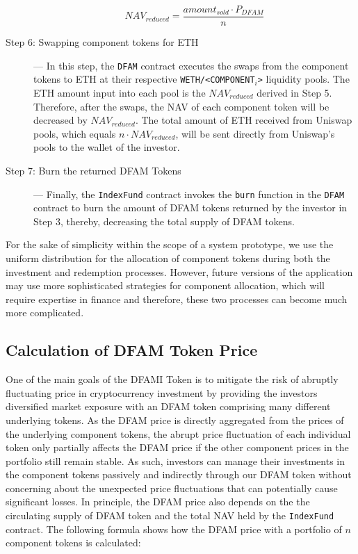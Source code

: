 \begin{description}
\begin{equation} \label{eq:navreduced}
NAV_{reduced} = \frac{amount_{sold} \cdot P_{DFAM}}{n} 
\end{equation}
  

\item[Step 6: Swapping component tokens for ETH] --- In this step, the \texttt{DFAM} contract executes the swaps from the component tokens to ETH at their respective \texttt{WETH/<COMPONENT$_i$>} liquidity pools. The ETH amount input into each pool is the $NAV_{reduced}$ derived in Step 5. Therefore, after the swaps, the NAV of each component token will be decreased by $NAV_{reduced}$. The total amount of ETH received from Uniswap pools, which equals $n \cdot NAV_{reduced}$, will be sent directly from Uniswap's pools to the wallet of the investor.


\item[Step 7: Burn the returned DFAM Tokens] --- Finally, the \texttt{IndexFund} contract invokes the \texttt{burn} function in the \texttt{DFAM} contract to burn the amount of DFAM tokens returned by the investor in Step 3, thereby, decreasing the total supply of DFAM tokens.

\end{description}

For the sake of simplicity within the scope of a system prototype, we use the uniform distribution for the allocation of component tokens during both the investment and redemption processes. However, future versions of the application may use more sophisticated strategies for component allocation, which will require expertise in finance and therefore, these two processes can become much more complicated.

\subsection{Calculation of DFAM Token Price} \label{subsec:indexprice}

One of the main goals of the DFAMI Token is to mitigate the risk of abruptly fluctuating price in cryptocurrency investment by providing the investors diversified market exposure with an DFAM token comprising many different underlying tokens. As the DFAM price is directly aggregated from the prices of the underlying component tokens, the abrupt price fluctuation of each individual token only partially affects the DFAM price if the other component prices in the portfolio still remain stable. As such, investors can manage their investments in the component tokens passively and indirectly through our DFAM token without concerning about the unexpected price fluctuations that can potentially cause significant losses. In principle, the DFAM price also depends on the the circulating supply of DFAM token and the total NAV held by the \texttt{IndexFund} contract. The following formula shows how the DFAM price with a portfolio of $n$ component tokens is calculated:


